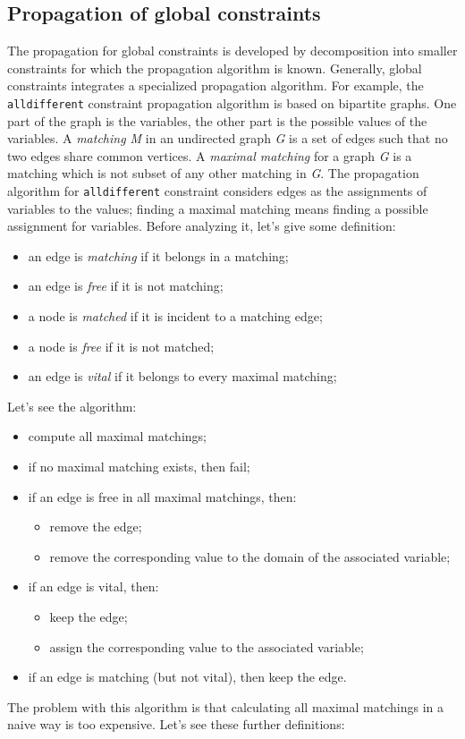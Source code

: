 \documentclass[10pt,a4paper]{article}
\begin{document}
\subsection{Propagation of global constraints}
The propagation for global constraints is developed by decomposition into
smaller constraints for which the propagation algorithm is known. Generally,
global constraints integrates a specialized propagation algorithm. For example,
the \texttt{alldifferent} constraint propagation algorithm is based on bipartite
graphs. One part of the graph is the variables, the other part is the possible
values of the variables. A \textit{matching M} in an undirected graph \textit{G}
is a set of edges such that no two edges share common vertices. A
\textit{maximal matching} for a graph \textit{G} is a matching which is not
subset of any other matching in \textit{G}. The propagation algorithm for
\texttt{alldifferent} constraint considers edges as the assignments of variables
to the values; finding a maximal matching means finding a possible assignment
for variables. Before analyzing it, let's give some definition:

\begin{itemize}
    \item an edge is \textit{matching} if it belongs in a matching;
    \item an edge is \textit{free} if it is not matching;
    \item a node is \textit{matched} if it is incident to a matching edge;
    \item a node is \textit{free} if it is not matched;
    \item an edge is \textit{vital} if it belongs to every maximal matching;
\end{itemize}
Let's see the algorithm:

\begin{itemize}
    \item compute all maximal matchings;
    \item if no maximal matching exists, then fail;
    \item if an edge is free in all maximal matchings, then:
    \begin{itemize}
        \item remove the edge;
        \item remove the corresponding value to the domain of the associated
        variable;
    \end{itemize}
    \item if an edge is vital, then:
    \begin{itemize}
        \item keep the edge;
        \item assign the corresponding value to the associated variable;
    \end{itemize}
    \item if an edge is matching (but not vital), then keep the edge.
\end{itemize}
The problem with this algorithm is that calculating all maximal matchings in a
naive way is too expensive. Let's see these further definitions:
\end{document}
